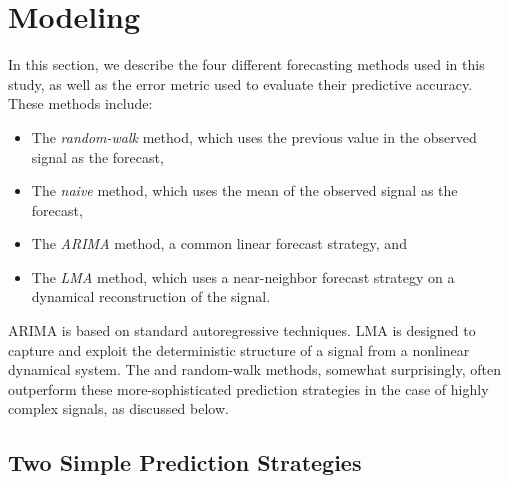 \section{Modeling }\label{sec:model}
% 
% 
% 
% 

In this section, we describe the four different forecasting methods
used in this study, as well as the error metric used to evaluate their
predictive accuracy.  These methods include:
\begin{itemize}
\item The \emph{random-walk} method, which uses the previous value in
  the observed signal as the forecast,

\item The \emph{naive} method, which uses the mean of the
  observed signal as the forecast,

\item The \emph{ARIMA} method, a common linear forecast strategy, and

\item The \emph{LMA} method, which uses a near-neighbor forecast
  strategy on a dynamical reconstruction of the signal.
\end{itemize}
ARIMA is based on standard autoregressive techniques.  LMA is designed
to capture and exploit the deterministic structure of a signal from a
nonlinear dynamical system.  The \naive and random-walk methods,
somewhat surprisingly, often outperform these more-sophisticated
prediction strategies in the case of highly complex signals, as
discussed below.

\subsection{Two Simple Prediction Strategies}
\label{sec:simple}

